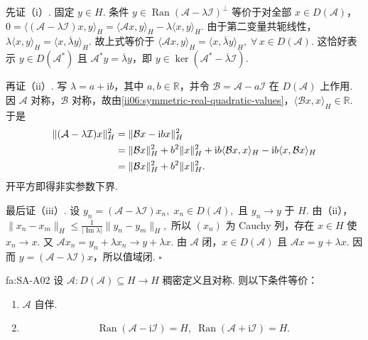 \begin{FAProof}
先证（i）. 固定 \(\displaystyle y\in H\). 条件 \(\displaystyle y\in\operatorname{Ran}(\mathcal A-\lambda\mathcal I)^\perp\) 等价于对全部 \(\displaystyle x\in D(\mathcal A)\)，
\(\displaystyle 0 = \langle(\mathcal A-\lambda\mathcal I)x,y\rangle_H = \langle\mathcal Ax,y\rangle_H - \lambda\langle x,y\rangle_H.\)
由于第二变量共轭线性，
\(\displaystyle \lambda\langle x,y\rangle_H = \langle x,\overline\lambda y\rangle_H.\)
故上式等价于
\(\displaystyle \langle\mathcal Ax,y\rangle_H = \langle x,\overline\lambda y\rangle_H ,\; \forall\,x\in D(\mathcal A).\)
这恰好表示 \(\displaystyle y\in D(\mathcal A^*)\) 且 \(\displaystyle\mathcal A^*y=\overline\lambda y\)，即 \(\displaystyle y\in\ker(\mathcal A^*-\overline\lambda\mathcal I)\).

再证（ii）. 写 \(\displaystyle\lambda=a+\mathrm{i}b\)，其中 \(\displaystyle a,b\in\mathbb R\)，并令 \(\displaystyle\mathcal B=\mathcal A-a\mathcal I\) 在 \(\displaystyle D(\mathcal A)\) 上作用. 因 \(\displaystyle\mathcal A\) 对称，\(\displaystyle\mathcal B\) 对称，故由\autoref{ii06:symmetric-real-quadratic-values}，\(\displaystyle\langle\mathcal Bx,x\rangle_H\in\mathbb R\). 于是
\[
\begin{aligned}
\displaystyle \|(\mathcal A-\lambda\mathcal I)x\|_H^2 &\displaystyle = \|\mathcal Bx-\mathrm{i}b x\|_H^2\\
\displaystyle &\displaystyle = \|\mathcal Bx\|_H^2+b^2\|x\|_H^2 +\mathrm{i}b\langle\mathcal Bx,x\rangle_H -\mathrm{i}b\langle x,\mathcal Bx\rangle_H\\
\displaystyle &\displaystyle = \|\mathcal Bx\|_H^2+b^2\|x\|_H^2.
\end{aligned}
\]
开平方即得非实参数下界.

最后证（iii）. 设
\(\displaystyle y_n=(\mathcal A-\lambda\mathcal I)x_n,\; x_n\in D(\mathcal A),\)
且 \(\displaystyle y_n\to y\) 于 \(\displaystyle H\). 由（ii），
\(\displaystyle \|x_n-x_m\|_H \leqslant \frac{1}{|\operatorname{Im}\lambda|}\|y_n-y_m\|_H,\)
所以 \(\displaystyle(x_n)\) 为 Cauchy 列，存在 \(\displaystyle x\in H\) 使 \(\displaystyle x_n\to x\). 又
\(\displaystyle \mathcal Ax_n=y_n+\lambda x_n\longrightarrow y+\lambda x.\)
由 \(\displaystyle\mathcal A\) 闭，\(\displaystyle x\in D(\mathcal A)\) 且 \(\displaystyle\mathcal Ax=y+\lambda x\). 因而 \(\displaystyle y=(\mathcal A-\lambda\mathcal I)x\)，所以值域闭.
\hfill\(\square\)
\end{FAProof}

\begin{FATheorem}[A][自伴性的非实值域判据]{fa:SA-A02}
设 \(\displaystyle\mathcal A:D(\mathcal A)\subseteq H\to H\) 稠密定义且对称. 则以下条件等价：
\begin{enumerate}[label=\textnormal{(\roman*)}]
\item \(\displaystyle\mathcal A\) 自伴.
\item
\[
\operatorname{Ran}(\mathcal A-\mathrm{i}\mathcal I)=H,
\;
\operatorname{Ran}(\mathcal A+\mathrm{i}\mathcal I)=H.
\]
\end{enumerate}
\end{FATheorem}

